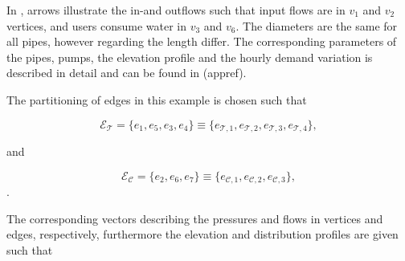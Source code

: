 %  

In , arrows illustrate the in-and outflows such that input flows are in $v_1 $ and $v_2$ vertices, and users consume water in $v_3$ and $v_6$. The diameters are the same for all pipes, however regarding the length differ. The corresponding parameters of the pipes, pumps, the elevation profile and the hourly demand variation is described in detail and can be found in (appref). 

The partitioning of edges in this example is chosen such that

\begin{equation}
  \label{edgeorientation_example1_T}
  \mathcal{E}_{\mathcal{T}} = \{ e_1, e_5, e_3, e_4 \} \equiv \{ e_{\mathcal{T},1}, e_{\mathcal{T},2}, e_{\mathcal{T},3}, e_{\mathcal{T},4}  \},
\end{equation}

and

\begin{equation}
\label{edgeorientation_example1_C}
  \mathcal{E}_\mathcal{C} = \{e_2, e_6, e_7\} \equiv \{e_{\mathcal{C},1}, e_{\mathcal{C},2}, e_{\mathcal{C},3}\},
\end{equation}.

The corresponding vectors describing the pressures and flows in vertices and edges, respectively, furthermore the elevation and distribution profiles are given such that

